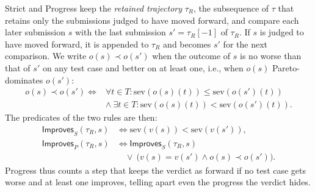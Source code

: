 \documentclass[conference]{IEEEtran}
\begin{document}
Strict and Progress keep the \emph{retained trajectory} \(\tau_R\), the subsequence of \(\tau\) that retains only the submissions judged to have moved forward, and compare each later submission \(s\) with the last submission \(s'=\tau_R[-1]\) of \(\tau_R\). If \(s\) is judged to have moved forward, it is appended to \(\tau_R\) and becomes \(s'\) for the next comparison. We write \(o(s)\prec o(s')\) when the outcome of \(s\) is no worse than that of \(s'\) on any test case and better on at least one, i.e., when \(o(s)\) Pareto-dominates \(o(s')\):
\[
\begin{aligned}
o(s)\prec o(s')\iff{}&\forall t\in T:\mathrm{sev}(o(s)(t))\le\mathrm{sev}(o(s')(t))\\
&\land\ \exists t\in T:\mathrm{sev}(o(s)(t))<\mathrm{sev}(o(s')(t)).
\end{aligned}
\]
The predicates of the two rules are then:
\begin{equation}
\begin{aligned}
\mathsf{Improves}_S(\tau_R,s)&\iff \mathrm{sev}(v(s))<\mathrm{sev}(v(s')),\\
\mathsf{Improves}_P(\tau_R,s)&\iff \mathsf{Improves}_S(\tau_R,s)\\
 &\quad\lor\ \bigl(v(s)=v(s')\land o(s)\prec o(s')\bigr).
\end{aligned}
\label{eq:progress}
\end{equation}
Progress thus counts a step that keeps the verdict as forward if no test case gets worse and at least one improves, telling apart even the progress the verdict hides.
\end{document}
